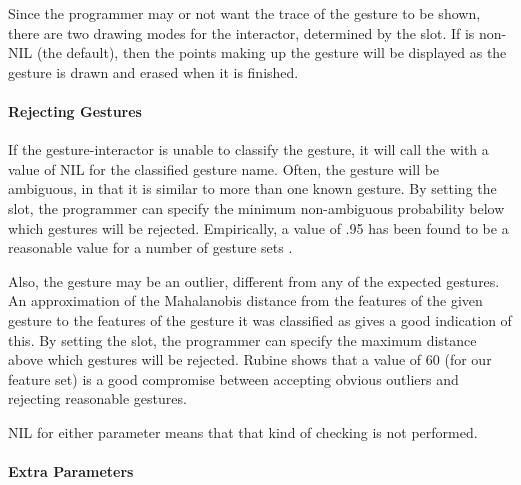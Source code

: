 Since the programmer may or not want the trace of the gesture to be
shown, there are two drawing modes for the interactor, determined by the
 slot.  If  is non-NIL (the default), then the
points making up the gesture will be displayed as the gesture is drawn
and erased when it is finished.

\paragraph{Rejecting Gestures}
\label{rejecting-gestures}
If the gesture-interactor is unable to classify the gesture, it will
call the  with a value of NIL for the classified
gesture name. Often,
the gesture will be ambiguous, in that it is similar to more than one
known gesture.  By setting the  slot, the
programmer can specify the minimum non-ambiguous probability below which
gestures will be rejected. Empirically, a value of .95 has been found to
be a reasonable value for a number of gesture sets \cite{rubine}.

Also, the gesture may be an outlier, different from any of the expected
gestures. An approximation of the Mahalanobis distance from the features
of the given gesture to the features of the gesture it was classified as
gives a good indication of this.  By setting the 
slot, the programmer can specify the maximum distance above which
gestures will be rejected. Rubine shows that a value of 60 (for our
feature set) is a good compromise between accepting obvious outliers and
rejecting reasonable gestures.

NIL for either parameter means that that kind of checking is not performed.

\paragraph{Extra Parameters}

